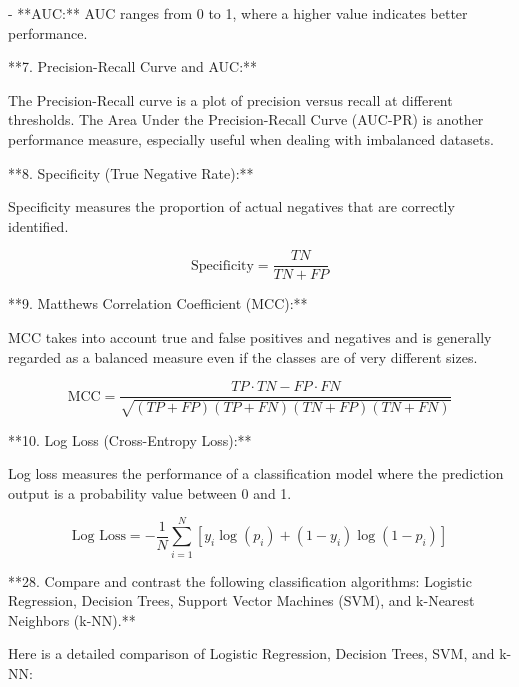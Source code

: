 - **AUC:** AUC ranges from 0 to 1, where a higher value indicates better performance.

**7. Precision-Recall Curve and AUC:**

The Precision-Recall curve is a plot of precision versus recall at different thresholds. The Area Under the Precision-Recall Curve (AUC-PR) is another performance measure, especially useful when dealing with imbalanced datasets.

**8. Specificity (True Negative Rate):**

Specificity measures the proportion of actual negatives that are correctly identified.

\[ \text{Specificity} = \frac{TN}{TN + FP} \]

**9. Matthews Correlation Coefficient (MCC):**

MCC takes into account true and false positives and negatives and is generally regarded as a balanced measure even if the classes are of very different sizes.

\[ \text{MCC} = \frac{TP \cdot TN - FP \cdot FN}{\sqrt{(TP + FP)(TP + FN)(TN + FP)(TN + FN)}} \]

**10. Log Loss (Cross-Entropy Loss):**

Log loss measures the performance of a classification model where the prediction output is a probability value between 0 and 1.

\[ \text{Log Loss} = -\frac{1}{N} \sum_{i=1}^N [y_i \log(p_i) + (1 - y_i) \log(1 - p_i)] \]

 **28. Compare and contrast the following classification algorithms: Logistic Regression, Decision Trees, Support Vector Machines (SVM), and k-Nearest Neighbors (k-NN).**

Here is a detailed comparison of Logistic Regression, Decision Trees, SVM, and k-NN:

